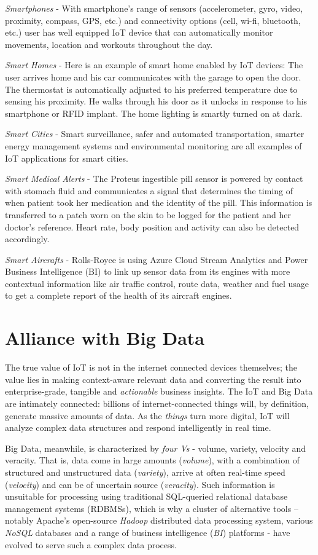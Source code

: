 \documentclass[sigconf]{acmart}
\begin{document}
{\em Smartphones} - With smartphone's range of sensors (accelerometer, gyro, video, proximity, compass, GPS, etc.) and connectivity options (cell, wi-fi, bluetooth, etc.) user has well equipped IoT device that can automatically monitor movements, location and workouts throughout the day.

{\em Smart Homes} - Here is an example of smart home enabled by IoT devices: The user arrives home and his car communicates with the garage to open the door. The thermostat is automatically adjusted to his preferred temperature due to sensing his proximity. He walks through his door as it unlocks in response to his smartphone or RFID implant. The home lighting is smartly turned on at dark.

{\em Smart Cities} - Smart surveillance, safer and automated transportation, smarter energy management systems and environmental monitoring are all examples of IoT applications for smart cities.

{\em Smart Medical Alerts} - The Proteus ingestible pill sensor is powered by contact with stomach fluid and communicates a signal that determines the timing of when patient took her medication and the identity of the pill. This information is transferred to a patch worn on the skin to be logged for the patient and her doctor's reference. Heart rate, body position and activity can also be detected accordingly.

{\em Smart Aircrafts} - Rolls-Royce is using Azure Cloud Stream Analytics and Power Business Intelligence (BI) to link up sensor data from its engines with more contextual information like air traffic control, route data, weather and fuel usage to get a complete report of the health of its aircraft engines.

\section{Alliance with Big Data}

The true value of IoT is not in the internet connected devices themselves; the value lies in making context-aware relevant data and converting the result into enterprise-grade, tangible and {\em actionable} business insights. The IoT and Big Data are intimately connected: billions of internet-connected things will, by definition, generate massive amounts of data. As the {\em things} turn more digital, IoT will analyze complex data structures and respond intelligently in real time. 

Big Data, meanwhile, is characterized by {\em four Vs} - volume, variety, velocity and veracity\cite{3_wiki_bigdata}. That is, data come in large amounts ({\em volume}), with a combination of structured and unstructured data ({\em variety}), arrive at often real-time speed ({\em velocity}) and can be of uncertain source ({\em veracity}). Such information is unsuitable for processing using traditional SQL-queried relational database management systems (RDBMSs), which is why a cluster of alternative tools -- notably Apache's open-source {\em Hadoop} distributed data processing system, various {\em NoSQL} databases and a range of business intelligence ({\em BI}) platforms - have evolved to serve such a complex data process.
\end{document}
